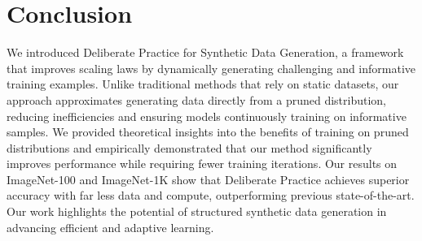 \section{Conclusion}
We introduced Deliberate Practice for Synthetic Data Generation, a framework that improves scaling laws by dynamically generating challenging and informative training examples. Unlike traditional methods that rely on static datasets, our approach approximates generating data directly from a pruned distribution, reducing inefficiencies and ensuring models continuously training on informative samples. We provided theoretical insights into the benefits of training on pruned distributions and empirically demonstrated that our method significantly improves performance while requiring fewer training iterations. Our results on ImageNet-100 and ImageNet-1K show that Deliberate Practice achieves superior accuracy with far less data and compute, outperforming previous state-of-the-art. Our work highlights the potential of structured synthetic data generation in advancing efficient and adaptive learning.
